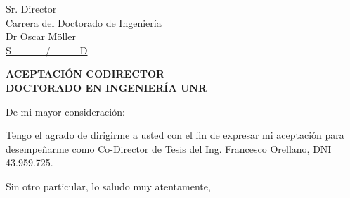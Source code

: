 \documentclass[a4paper,12pt]{letter}
\begin{document}
\begin{letter}{Sr. Director \\ Carrera del Doctorado de Ingeniería
\\ Dr Oscar M\"{o}ller \\ \underline{S\ \ \ \ \ \ \ /\ \ \ \ \ \ D}}
\begin{center}
\textbf{ACEPTACIÓN CODIRECTOR\\DOCTORADO EN INGENIERÍA UNR}
\end{center}

\opening{De mi mayor consideración:}

Tengo  el agrado de dirigirme a usted con el fin de expresar mi aceptación para desempeñarme como Co-Director de Tesis del Ing. Francesco Orellano, DNI 43.959.725.


Sin otro particular, lo saludo muy atentamente,

\closing{\  }

\end{letter}
\end{document}
